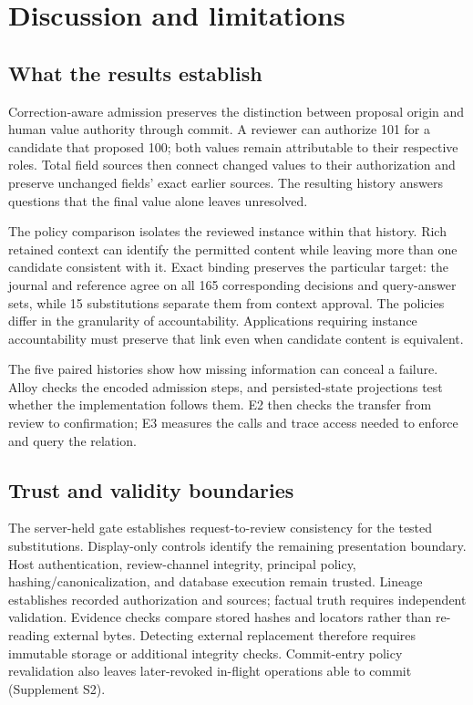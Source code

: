 \section{Discussion and limitations}
\label{sec:discussion}

\subsection{What the results establish}

Correction-aware admission preserves the distinction between proposal origin and human value authority through commit. A reviewer can authorize 101 for a candidate that proposed 100; both values remain attributable to their respective roles. Total field sources then connect changed values to their authorization and preserve unchanged fields' exact earlier sources. The resulting history answers questions that the final value alone leaves unresolved.

The policy comparison isolates the reviewed instance within that history. Rich retained context can identify the permitted content while leaving more than one candidate consistent with it. Exact binding preserves the particular target: the journal and reference agree on all 165 corresponding decisions and query-answer sets, while 15 substitutions separate them from context approval. The policies differ in the granularity of accountability. Applications requiring instance accountability must preserve that link even when candidate content is equivalent.

The five paired histories show how missing information can conceal a failure. Alloy checks the encoded admission steps, and persisted-state projections test whether the implementation follows them. E2 then checks the transfer from review to confirmation; E3 measures the calls and trace access needed to enforce and query the relation.

\subsection{Trust and validity boundaries}

The server-held gate establishes request-to-review consistency for the tested substitutions. Display-only controls identify the remaining presentation boundary. Host authentication, review-channel integrity, principal policy, hashing/canonicalization, and database execution remain trusted. Lineage establishes recorded authorization and sources; factual truth requires independent validation. Evidence checks compare stored hashes and locators rather than re-reading external bytes. Detecting external replacement therefore requires immutable storage or additional integrity checks. Commit-entry policy revalidation also leaves later-revoked in-flight operations able to commit (Supplement S2).

